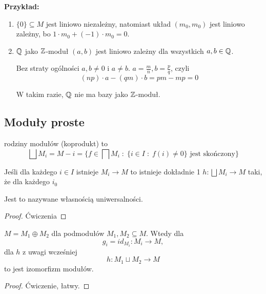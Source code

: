 \textbf{Przykład:}

\begin{enumerate}
    \item $\{0\}\subseteq M$ jest liniowo niezależny, natomiast układ $(m_0,m_0)$ jest liniowo zależny, bo $1\cdot m_0+(-1)\cdot m_0=0$.
    \item $\mathbb{Q}$ jako $\mathbb{Z}$-moduł $(a, b)$ jest liniowo zależny dla wszystkich $a,b\in\mathbb{Q}$.

    Bez straty ogólności $a,b\neq 0$ i $a\neq b$. $a=\frac{m}{n},b=\frac{p}{q}$, czyli
    $$(np)\cdot a-(qm)\cdot b=pm-mp=0$$

    W takim razie, $\mathbb{Q}$ nie ma bazy jako $\mathbb{Z}$-moduł.
\end{enumerate}

\setcounter{theorem}{0}
\subsection{Moduły proste}

\begin{bbox}
 rodziny modułów (koprodukt) to
$$\bigsqcup M_i= M-i=\{f\in\bigsqcap M_i\;:\;\{i\in I\;:\;f(i)\neq 0\}\text{ jest skończony}\}$$
\end{bbox}

\begin{remark}
Jeśli dla każdego $i\in I$ istnieje $M_i\to M$ to istnieje dokładnie 1 $h:\bigsqcup M_i\to M$ taki, że dla każdego $i_0$

\begin{center}\end{center}

Jest to nazywane własnością uniwersalności.
\end{remark}

\begin{proof}
  Ćwiczenia
\end{proof}

\begin{remark}
$M=M_1\oplus M_2$ dla podmodułów $M_1,M_2\subseteq M$. Wtedy dla 
$$g_i=id_{M_i}:M_i\to M,$$ 
dla $h$ z uwagi wcześniej
$$h:M_1\sqcup M_2\to M$$
to jest izomorfizm modułów.
\end{remark}
\begin{proof}
Ćwiczenie, łatwy.
\end{proof}

